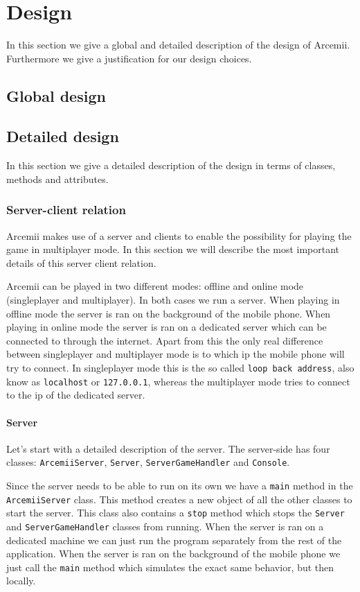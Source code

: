 \documentclass[../main.tex]{subfiles}
\begin{document}
\pagebreak

\section{Design}
In this section we give a global and detailed description of the design of Arcemii. Furthermore we give a justification for our design choices.

	\subsection{Global design}

    \subsection{Detailed design}
    In this section we give a detailed description of the design in terms of classes, methods and attributes.

        \subsubsection{Server-client relation}
        Arcemii makes use of a server and clients to enable the possibility for playing the game in multiplayer mode. In this section we will describe the most important details of this server client relation.

        Arcemii can be played in two different modes: offline and online mode (singleplayer and multiplayer). In both cases we run a server. When playing in offline mode the server is ran on the background of the mobile phone. When playing in online mode the server is ran on a dedicated server which can be connected to through the internet. Apart from this the only real difference between singleplayer and multiplayer mode is to which ip the mobile phone will try to connect. In singleplayer mode this is the so called \texttt{loop back address}, also know as \texttt{localhost} or \texttt{127.0.0.1}, whereas the multiplayer mode tries to connect to the ip of the dedicated server. 

        \paragraph{Server} 
        Let's start with a detailed description of the server. The server-side has four classes: \texttt{ArcemiiServer}, \texttt{Server}, \texttt{ServerGameHandler} and \texttt{Console}. 
        
        Since the server needs to be able to run on its own we have a \texttt{main} method in the \texttt{ArcemiiServer} class. This method creates a new object of all the other classes to start the server. This class also contains a \texttt{stop} method which stops the \texttt{Server} and \texttt{ServerGameHandler} classes from running. When the server is ran on a dedicated machine we can just run the program separately from the rest of the application. When the server is ran on the background of the mobile phone we just call the \texttt{main} method which simulates the exact same behavior, but then locally.
\end{document}

